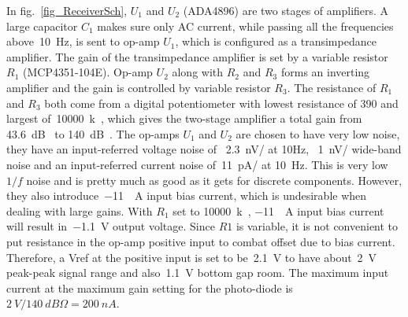 In fig.~\ref{fig_ReceiverSch}, $U_1$ and $U_2$ (ADA4896) are two stages of amplifiers.  A large capacitor $C_1$ makes sure only AC current, while passing all the frequencies above~\qty{10}{Hz}, is sent to op-amp $U_1$, which is configured as a transimpedance amplifier.  The gain of the transimpedance amplifier is set by a variable resistor $R_1$ (MCP4351-104E).  Op-amp $U_2$ along with $R_2$ and $R_3$ forms an inverting amplifier and the gain is controlled by variable resistor $R_3$.  The resistance of $R_1$ and $R_3$ both come from a digital potentiometer with  lowest resistance of \qty{390}{\Omega} and largest of~\qty{10000}{k\Omega}, which gives the two-stage amplifier a total gain from \qty{43.6}{dB\Omega} to \qty{140}{dB\Omega}.  The op-amps $U_1$ and $U_2$ are chosen to have very low noise, they have an input-referred voltage noise of ~\qty{2.3}{nV/\sqrthz} at 10Hz, ~\qty{1}{nV/\sqrthz} wide-band noise and an input-referred current noise of~\qty{11}{pA/\sqrthz} at \qty{10}{\Hz}.  This is very low $1/f$ noise and is pretty much as good as it gets for discrete components.  However, they also introduce~\qty{-11}{\mu A} input bias current, which is undesirable when dealing with large gains.  With $R_1$ set to \qty{10000}{k\Omega}, \qty{-11}{\mu A} input bias current will result in~\qty{-1.1}{V} output voltage.  Since $R1$ is variable, it is not convenient to put resistance in the op-amp positive input to combat offset due to bias current.  Therefore, a Vref at the positive input is set to be~\qty{2.1}{V} to have about~\qty{2}{V} peak-peak signal range and also~\qty{1.1}{V} bottom gap room.  The maximum input current at the maximum gain setting for the photo-diode is~$\qty{2}{V}/\qty{140}{dB\Omega}=\qty{200}{nA}$.

